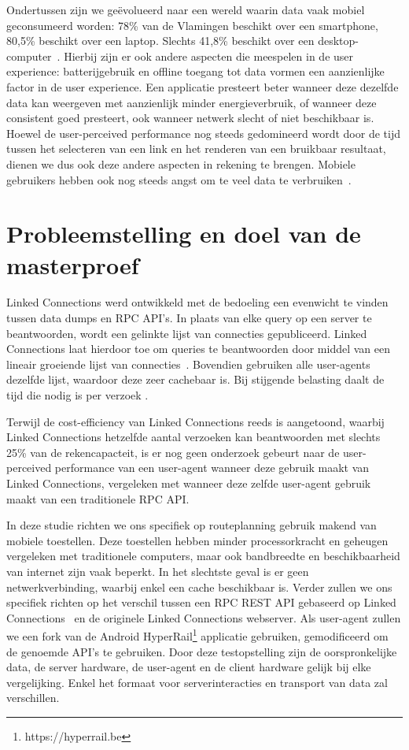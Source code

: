 Ondertussen zijn we geëvolueerd naar een wereld waarin data vaak mobiel geconsumeerd worden: 78\% van de Vlamingen beschikt over een smartphone, 80,5\% beschikt over een laptop. Slechts 41,8\% beschikt over een desktop-computer~\citep{digimeter17}. Hierbij zijn er ook andere aspecten die meespelen in de user experience: batterijgebruik en offline toegang tot data vormen een aanzienlijke factor in de user experience. Een applicatie presteert beter wanneer deze dezelfde data kan weergeven met aanzienlijk minder energieverbruik, of wanneer deze consistent goed presteert, ook wanneer netwerk slecht of niet beschikbaar is. Hoewel de user-perceived performance nog steeds gedomineerd wordt door de tijd tussen het selecteren van een link en het renderen van een bruikbaar resultaat, dienen we dus ook deze andere aspecten in rekening te brengen. Mobiele gebruikers hebben ook nog steeds angst om te veel data te verbruiken~\citep{ammelrooy17}.


\section{Probleemstelling en doel van de masterproef}
\label{sec:problem}

Linked Connections werd ontwikkeld met de bedoeling een evenwicht te vinden tussen data dumps en RPC API's. In plaats van elke query op een server te beantwoorden, wordt een gelinkte lijst van connecties gepubliceerd. Linked Connections laat hierdoor toe om queries te beantwoorden door middel van een lineair groeiende lijst van connecties~\citep{colpaert15}. Bovendien gebruiken alle user-agents dezelfde lijst, waardoor deze zeer cachebaar is. Bij stijgende belasting daalt de tijd die nodig is per verzoek \citep{colpaert17}.

Terwijl de cost-efficiency van Linked Connections reeds is aangetoond, waarbij Linked Connections hetzelfde aantal verzoeken kan beantwoorden met slechts 25\% van de rekencapacteit\citep{colpaert17,Melendez17}, is er nog geen onderzoek gebeurt naar de user-perceived performance van een user-agent wanneer deze gebruik maakt van Linked Connections, vergeleken met wanneer deze zelfde user-agent gebruik maakt van een traditionele RPC API. 

In deze studie richten we ons specifiek op routeplanning gebruik makend van mobiele toestellen. Deze toestellen hebben minder processorkracht en geheugen vergeleken met traditionele computers, maar ook bandbreedte en beschikbaarheid van internet zijn vaak beperkt. In het slechtste geval is er geen netwerkverbinding, waarbij enkel een cache beschikbaar is. Verder zullen we ons specifiek richten op het verschil tussen een RPC REST API gebaseerd op Linked Connections~\citep{colpaert17} en de originele Linked Connections webserver. Als user-agent zullen we een fork van de Android HyperRail\footnote{https://hyperrail.be} applicatie gebruiken, gemodificeerd om de genoemde API's te gebruiken. Door deze testopstelling zijn de oorspronkelijke data, de server hardware, de user-agent en de client hardware gelijk bij elke vergelijking. Enkel het formaat voor serverinteracties en transport van data zal verschillen.

